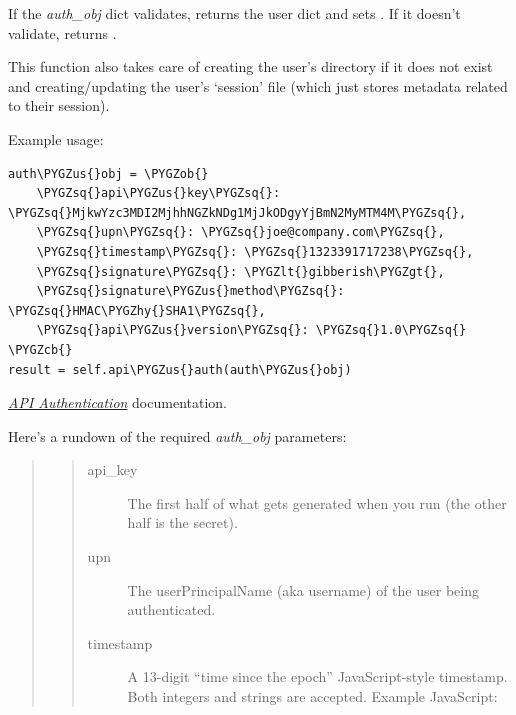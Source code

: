 \documentclass[letterpaper,10pt,openany]{sphinxmanual}
\def\PYGZus{\char`\_}
\def\PYGZob{\char`\{}
\def\PYGZcb{\char`\}}
\def\PYGZlt{\char`\<}
\def\PYGZgt{\char`\>}
\def\PYGZhy{\char`\-}
\def\PYGZsq{\char`\'}
\begin{document}
\begin{fulllineitems}

\begin{fulllineitems}
\label{Developer/server:gateone.core.server.ApplicationWebSocket.api_auth}
If the \emph{auth\_obj} dict validates, returns the user dict and sets
.  If it doesn't validate, returns .

This function also takes care of creating the user's directory if it
does not exist and creating/updating the user's `session' file (which
just stores metadata related to their session).

Example usage:

\begin{Verbatim}[commandchars=\\\{\}]
auth\PYGZus{}obj = \PYGZob{}
    \PYGZsq{}api\PYGZus{}key\PYGZsq{}: \PYGZsq{}MjkwYzc3MDI2MjhhNGZkNDg1MjJkODgyYjBmN2MyMTM4M\PYGZsq{},
    \PYGZsq{}upn\PYGZsq{}: \PYGZsq{}joe@company.com\PYGZsq{},
    \PYGZsq{}timestamp\PYGZsq{}: \PYGZsq{}1323391717238\PYGZsq{},
    \PYGZsq{}signature\PYGZsq{}: \PYGZlt{}gibberish\PYGZgt{},
    \PYGZsq{}signature\PYGZus{}method\PYGZsq{}: \PYGZsq{}HMAC\PYGZhy{}SHA1\PYGZsq{},
    \PYGZsq{}api\PYGZus{}version\PYGZsq{}: \PYGZsq{}1.0\PYGZsq{}
\PYGZcb{}
result = self.api\PYGZus{}auth(auth\PYGZus{}obj)
\end{Verbatim}




{\hyperref[Developer/embedding_api_auth:api-auth]{\emph{API Authentication}}} documentation.



Here's a rundown of the required \emph{auth\_obj} parameters:
\begin{quote}
\begin{quote}\begin{description}
\item[{api\_key}] \leavevmode
The first half of what gets generated when you run
 (the other half is the secret).

\item[{upn}] \leavevmode
The userPrincipalName (aka username) of the user being
authenticated.

\item[{timestamp}] \leavevmode
A 13-digit ``time since the epoch'' JavaScript-style timestamp.
Both integers and strings are accepted.
Example JavaScript: 


\end{description}
\end{quote}
\end{quote}
\end{fulllineitems}
\end{fulllineitems}
\end{document}
